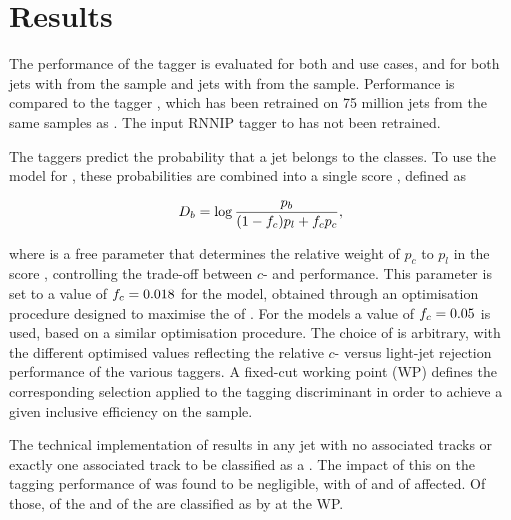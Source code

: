 \section{Results}\label{sec:gnn_results}


The performance of the \GNN tagger is evaluated for both \btag and \ctag use cases, and for both jets with \ttbarpt from the \ttbar sample and jets with \Zprimept from the \Zprime sample.
Performance is compared to the \DLr tagger \cite{ATL-PHYS-PUB-2017-013}, which has been retrained on 75 million jets from the same samples as \GNN.
The input RNNIP tagger \cite{ATL-PHYS-PUB-2017-003} to \DLr has not been retrained.

The taggers predict the probability that a jet belongs to the \bcl classes. To use the model for \btag, these probabilities are combined into a single score \Db, defined as

\begin{equation}\label{eq:btag-disc}
    \Db = \log{\frac{p_b}{(1-\fc )p_l + \fc  p_c}} ,
\end{equation}

where \fc is a free parameter that determines the relative weight of $p_c$ to $p_l$ in the score \Db, controlling the trade-off between $c$- and \lrej performance.
This parameter is set to a value of $f_c = 0.018$ for the \DLr model, obtained through an optimisation procedure designed to maximise the \clrej of \DLr \cite{ATL-PHYS-PUB-2017-013}.
For the \GNN models a value of $f_c = 0.05$ is used, based on a similar optimisation procedure.
The choice of \fc is arbitrary, with the different optimised values reflecting the relative $c$- versus light-jet rejection performance of the various taggers.
A fixed-cut working point (WP) defines the corresponding selection applied to the tagging discriminant \Db in order to achieve a given inclusive efficiency on the \ttbar sample.

The technical implementation of \GNN results in any jet with no associated tracks or exactly one associated track to be classified as a \ljet.
The impact of this on the tagging performance of \GNN was found to be negligible, with  of \ttbarbjets and  of \Zprimebjets affected.
Of those,  of the \ttbarbjets and  of the \Zprimebjets are classified as \ljets by \DLr at the  \ttbar WP.

